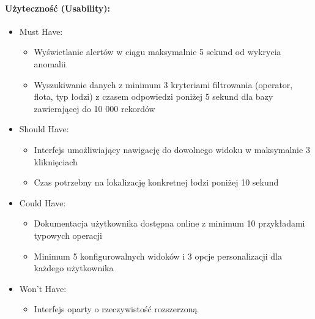 \documentclass[12pt,a4paper,polish]{article}
\begin{document}
\paragraph{Użyteczność (Usability):}
\begin{itemize}
	\item Must Have:
	      \begin{itemize}
		      \item Wyświetlanie alertów w ciągu maksymalnie 5 sekund od wykrycia anomalii
		      \item Wyszukiwanie danych z minimum 3 kryteriami filtrowania (operator, flota, typ łodzi) z czasem odpowiedzi poniżej 5 sekund dla bazy zawierającej do 10 000 rekordów
	      \end{itemize}
	\item Should Have:
	      \begin{itemize}
		      \item Interfejs umożliwiający nawigację do dowolnego widoku w maksymalnie 3 kliknięciach
		      \item Czas potrzebny na lokalizację konkretnej łodzi poniżej 10 sekund
	      \end{itemize}
	\item Could Have:
	      \begin{itemize}
		      \item Dokumentacja użytkownika dostępna online z minimum 10 przykładami typowych operacji
		      \item Minimum 5 konfigurowalnych widoków i 3 opcje personalizacji dla każdego użytkownika
	      \end{itemize}
	\item Won't Have:
	      \begin{itemize}
		      \item Interfejs oparty o rzeczywistość rozszerzoną
	      \end{itemize}
\end{itemize}
\end{document}
